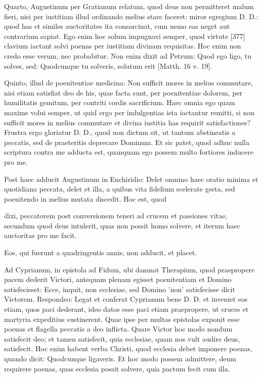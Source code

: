 Quarto, Augustinum per Gratianum relatum, quod deus non permitteret malum fieri, nisi per iustitiam illud ordinando melius stare faceret: miror egregium D. D.: quod has et similes auctoritates ita consarcinat, cum nemo eas neget aut contrarium sapiat. Ego enim hoc solum impugnavi semper, quod virtute [377] clavium iactant solvi poenas per iustitiam divinam requisitas. Hoc enim non credo esse verum, nec probabitur. Non enim dixit ad Petrum: Quod ego ligo, tu solves, sed: Quodcunque tu solveris, solutum erit [Matth. 16 v. 19].

Quinto, illud de poenitentiae medicina: Non sufficit mores in melius commutare, nisi etiam satisfiat deo de his, quae facta sunt, per poenitentiae dolorem, per humilitatis gemitum, per contriti cordis sacrificium. Haec omnia ego quam maxime volui semper, ut quid ergo per indulgentias ista iactantur remitti, si non sufficit mores in melius commutare et divina iustitia has requirit satisfactiones? Frustra ergo gloriatur D. D., quod non dictum sit, ut tantum abstineatis a peccatis, sed de praeteritis deprecare Dominum. Et sic patet, quod adhuc nulla scriptura contra me adducta est, quanquam ego possem multo fortiores inducere pro me.

Post haec adducit Augustinum in Enchiridio: Delet omnino haec oratio minima et quotidiana peccata, delet et illa, a quibus vita fidelium scelerate gesta, sed poenitendo in melius mutata discedit. Hoc est, quod

dixi, peccatorem post conversionem teneri ad crucem et passiones vitae, secundum quod deus intulerit, quas non possit homo solvere, et iterum haec auctoritas pro me facit.

Eos, qui fuerunt a quadringentis annis, non adducit, et placet.

Ad Cyprianum, in epistola ad Fidum, ubi damnat Therapium, quod praepropere pacem dederit Victori, antequam plenam egisset poenitentiam et Domino satisfecisset: Ecce, inquit, non ecclesiae, sed Domino 'non' satisfecisse dicit Victorem. Respondeo: Legat et conferat Cyprianum bene D. D. et inveniet eos etiam, quos paci dederant, ideo datos esse paci etiam praepropere, ut cruces et martyria expeditius sustinerent. Quae ipse per multas epistolas exponit esse poenas et flagella peccatis a deo inflicta. Quare Victor hoc modo nondum satisfecit deo; et tamen satisfecit, quia ecclesiae, quam nos vult audire deus, satisfecit. Hoc enim habent verba Christi, quod ecclesia debet imponere poenas, quando dicit: Quodcunque ligaveris. Et hoc modo possem admittere, deum requirere poenas, quas ecclesia possit solvere, quia pactum fecit cum illa.

